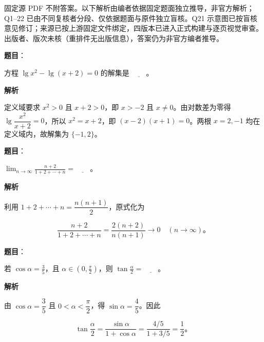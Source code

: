 

\begin{gktip}
固定源 PDF 不附答案。以下解析由编者依据固定题面独立推导，非官方解析；Q1–22 已由不同复核者分段、仅依据题面与原件独立盲核。Q21 示意图已按盲核意见修订；来源已按上游固定文件绑定，四版本已进入正式构建与逐页视觉审查。出版者、版次未核（重排件无出版信息），答案仍为非官方编者推导。
\end{gktip}

\begin{answer}

\textbf{题目}：

方程 $\lg x^2-\lg(x+2)=0$ 的解集是 $\underline{\qquad}$。

\textbf{解析}

定义域要求 $x^2>0$ 且 $x+2>0$，即 $x>-2$ 且 $x\ne0$。由对数差为零得 $\lg\dfrac{x^2}{x+2}=0$，所以 $x^2=x+2$，即 $(x-2)(x+1)=0$。两根 $x=2,-1$ 均在定义域内，故解集为 $\{-1,2\}$。


\end{answer}
\begin{answer}

\textbf{题目}：

$\displaystyle\lim_{n\to\infty}\frac{n+2}{1+2+\cdots+n}=\underline{\qquad}$。

\textbf{解析}

利用 $1+2+\cdots+n=\dfrac{n(n+1)}2$，原式化为

\nopagebreak[4]
\[
\frac{n+2}{1+2+\cdots+n}=\frac{2(n+2)}{n(n+1)}\longrightarrow0\quad(n\to\infty)\text{。}
\]


\end{answer}
\begin{answer}

\textbf{题目}：

若 $\cos\alpha=\frac35$，且 $\alpha\in\left(0,\frac\pi2\right)$，则 $\tan\frac\alpha2=\underline{\qquad}$。

\textbf{解析}

由 $\cos\alpha=\dfrac35$ 且 $0<\alpha<\dfrac\pi2$，得 $\sin\alpha=\dfrac45$。因此

\nopagebreak[4]
\[
\tan\frac\alpha2=\frac{\sin\alpha}{1+\cos\alpha}
=\frac{4/5}{1+3/5}=\frac12\text{。}
\]


\end{answer}
